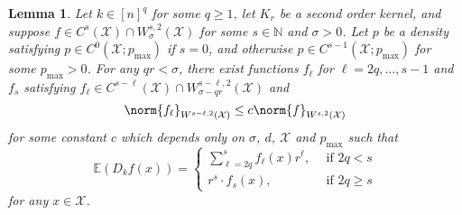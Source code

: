 \documentclass{article}
\newcommand{\1}{\mathbf{1}}
\newcommand{\Xset}{\mathcal{X}}
\newcommand{\Ebb}{\mathbb{E}}
\theoremstyle{alden}
\theoremstyle{aldenthm}
\newtheorem{lemma}{Lemma}
\theoremstyle{definition}
\theoremstyle{remark}
\begin{document}
\begin{lemma}
	\label{lem:leading_term_sobolev}
	Let $k \in [n]^q$ for some $q \geq 1$, let $K_r$ be a second order kernel, and suppose $f \in C^{s}(\Xset) \cap W_{\sigma}^{s,2}(\Xset)$ for some $s \in \mathbb{N}$ and $\sigma > 0$. Let $p$ be a density satisfying $p \in C^{0}(\Xset;p_{\max})$ if $s = 0$, and otherwise $p \in C^{s - 1}(\Xset;p_{\max})$ for some $p_{\max} > 0$. For any $qr < \sigma$, there exist functions $f_{\ell}$ for $\ell = 2q,\ldots,s - 1$ and $f_s$ satisfying $f_{\ell} \in C^{s - \ell}(\Xset) \cap W_{\sigma - qr}^{s - \ell,2}(\Xset)$ and
	\begin{equation*}
	\norm{f_{\ell}}_{W^{s - \ell,2}(\Xset)} \leq c \norm{f}_{W^{s,2}(\Xset)}
	\end{equation*}
	for some constant $c$ which depends only on $\sigma$, $d$, $\Xset$ and $p_{\max}$ such that
	\begin{equation}
	\label{eqn:leading_term_sobolev}
	\Ebb(D_kf(x)) =
	\begin{cases*}
	\sum_{\ell = 2q}^{s} f_{\ell}(x) r^{\ell} ,~~& \textrm{if $2q < s$} \\
	r^s \cdot f_{s}(x),~~& \textrm{if $2q \geq s$}
	\end{cases*}
	\end{equation}
	for any $x \in \Xset$.
\end{lemma}
\end{document}
